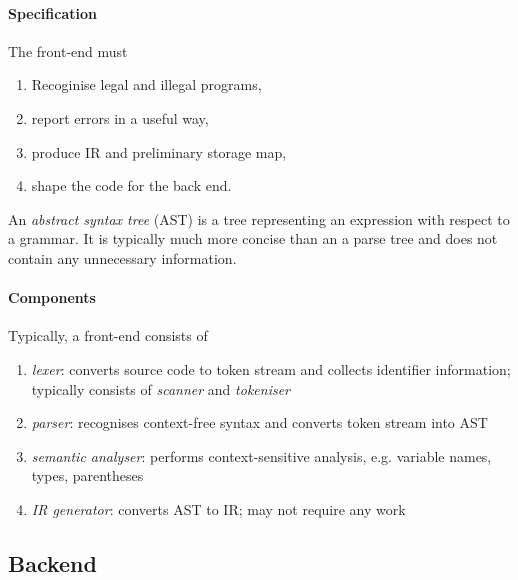\documentclass{article}
\begin{document}
\paragraph{Specification} The front-end must
\begin{enumerate}
    \item Recoginise legal and illegal programs,
    \item report errors in a useful way,
    \item produce IR and preliminary storage map,
    \item shape the code for the back end.
\end{enumerate}

\begin{definition}
    An \emph{abstract syntax tree} (AST) is a tree representing an expression with
    respect to a grammar. It is typically much more concise than an a parse tree and
    does not contain any unnecessary information.
\end{definition}

\paragraph{Components} Typically, a front-end consists of
\begin{enumerate}
    \item \emph{lexer}: converts source code to token stream and collects identifier
          information; typically consists of \emph{scanner} and \emph{tokeniser}
    \item \emph{parser}: recognises context-free syntax and converts token stream
          into AST
    \item \emph{semantic analyser}: performs context-sensitive analysis, e.g. variable names, types, parentheses
    \item \emph{IR generator}: converts AST to IR; may not require any work
\end{enumerate}

\subsection{Backend}
\begin{center}
\end{center}
\end{document}

